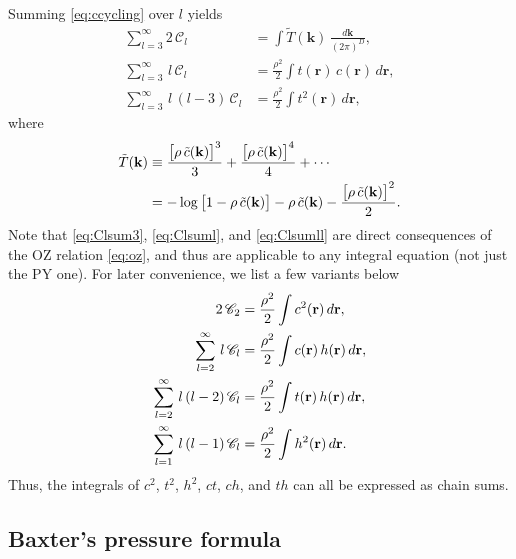 \documentclass[preprint]{revtex4-1}
\newcommand{\vct}[1]{\mathbf{#1}}
\providecommand{\vr}{} %
\renewcommand{\vr}{\vct{r}}
\newcommand{\vk}{\vct{k}}
\newcommand{\dvk}{\frac{d\vk}{(2\pi)^D}}
\newcommand{\Chn}{\mathscr{C}}
\begin{document}
Summing \eqref{eq:ccycling} over $l$ yields
%
\begin{align}
      \sum_{l=3}^{\infty} 2 \, \Chn_l
  &=  \int \tilde{T}(\vk) \, \dvk,
     \label{eq:Clsum3} \\
      \sum_{l=3}^{\infty} \, l \, \Chn_l
  &=
      \frac{ \rho^2 }{2} \int t(\vr) \, c(\vr) \, d\vr,
      \label{eq:Clsuml} \\
      \sum_{l=3}^{\infty} \, l \, (l - 3) \, \Chn_l
  &=  \frac{ \rho^2 }{ 2 }
      \int t^2(\vr) \, d\vr,
\label{eq:Clsumll}
\end{align}
%
where
\begin{align}
  \tilde{T}(\vk)
&\equiv
    \frac{ \big[ \rho \, \tilde{c}(\vk) \big]^3 } { 3 }
  + \frac{ \big[ \rho \, \tilde{c}(\vk) \big]^4 } { 4 }
  + \cdots
\notag \\
&=
  - \log\big[1 - \rho \, \tilde{c}(\vk) \big]
  - \rho \, \tilde{c}(\vk)
  - \frac{ \big[ \rho \, \tilde{c}(\vk) \big]^2 } { 2 }.
  \label{eq:logrhoc}
\end{align}
%
Note that \eqref{eq:Clsum3}, \eqref{eq:Clsuml}, and \eqref{eq:Clsumll}
  are direct consequences of the OZ relation \eqref{eq:oz},
  and thus are applicable to any integral equation (not just the PY one).
%
For later convenience, we list a few variants below
%
\begin{align}
      2 \, \Chn_2
  &=
      \frac{ \rho^2 }{2} \int c^2(\vr) \, d\vr,
\notag \\
%
      \sum_{l=2}^{\infty} \, l \, \Chn_l
  &=
      \frac{ \rho^2 }{2} \int c(\vr) \, h(\vr) \, d\vr,
\notag \\
%
      \sum_{l=2}^{\infty} \, l \, (l - 2) \, \Chn_l
  &=  \frac{ \rho^2 }{ 2 }
      \int t(\vr) \, h(\vr) \, d\vr,
\label{eq:Clsum_th} \\
%
      \sum_{l=1}^{\infty} \, l \, (l - 1) \, \Chn_l
  &=  \frac{ \rho^2 }{ 2 }
      \int h^2(\vr) \, d\vr.
\notag
\end{align}
%
Thus, the integrals of $c^2$, $t^2$, $h^2$, $ct$, $ch$, and $th$
can all be expressed as chain sums.



\subsection{Baxter's pressure formula}
\end{document}
